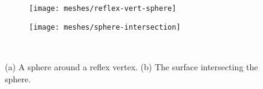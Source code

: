 \begin{figure}[htb]
        \centering
        \begin{subfigure}[b]{0.35\textwidth}
        \texttt{[image: meshes/reflex-vert-sphere]}
        \caption{}
          \label{fig:sphere-on-vert}
        \end{subfigure}
          \hspace{.0cm}
         \begin{subfigure}[b]{0.45\textwidth}
        \texttt{[image: meshes/sphere-intersection]}
        \caption{}
        \label{fig:sphere}
        \end{subfigure}\\
		\caption{(a) A sphere around a reflex vertex. (b) The surface
		intersecting the sphere.
		\label{fig:sphere}}
\end{figure}


